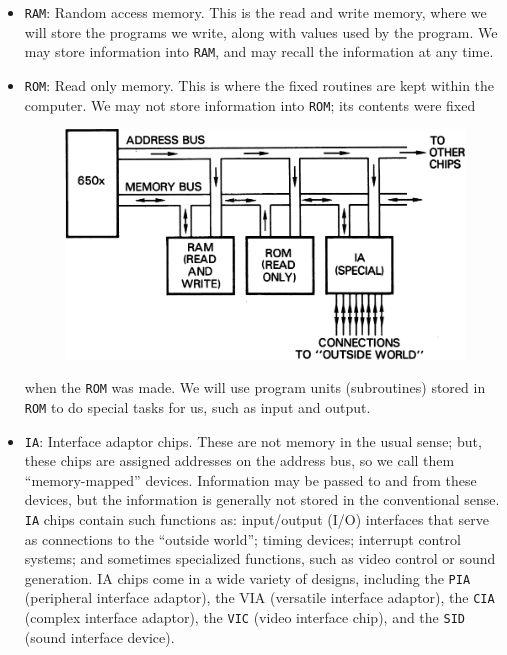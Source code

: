 \documentclass[11pt,a4paper,titlepage]{memoir}
\begin{document}
\begin{itemize}
	\item \texttt{RAM}: Random access memory. This is the read and write memory, where
	we will store the programs we write, along with values used by the program.
	We may store information into \texttt{RAM}, and may recall the information at any
	time.
	\item \texttt{ROM}: Read only memory. This is where the fixed routines are kept within the
	computer. We may not store information into \texttt{ROM}; its contents were fixed 
	
	\begin{figure}[h]
		\centering
		\includegraphics[width=1\linewidth]{screenshot006}
		\caption{}
		\label{fig:screenshot006}
	\end{figure}
	
	when the \texttt{ROM} was made. We will use program units (subroutines) stored in
	\texttt{ROM} to do special tasks for us, such as input and output.
	\item \texttt{IA}: Interface adaptor chips. These are not memory in the usual sense; but,
	these chips are assigned addresses on the address bus, so we call them
	``memory-mapped'' devices. Information may be passed to and from these
	devices, but the information is generally not stored in the conventional sense.
	\texttt{IA} chips contain such functions as: input/output (I/O) interfaces that serve
	as connections to the ``outside world''; timing devices; interrupt control systems; and sometimes specialized functions, such as video control or sound
	generation. IA chips come in a wide variety of designs, including the \texttt{PIA}
	(peripheral interface adaptor), the VIA (versatile interface adaptor), the \texttt{CIA}
	(complex interface adaptor), the \texttt{VIC} (video interface chip), and the \texttt{SID}
	(sound interface device).
\end{itemize}
\end{document}
